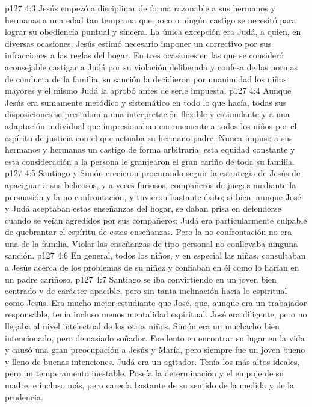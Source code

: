 \vs p127 4:3 Jesús empezó a disciplinar de forma razonable a sus hermanos y hermanas a una edad tan temprana que poco o ningún castigo se necesitó para lograr su obediencia puntual y sincera. La única excepción era Judá, a quien, en diversas ocasiones, Jesús estimó necesario imponer un correctivo por sus infracciones a las reglas del hogar. En tres ocasiones en las que se consideró aconsejable castigar a Judá por su violación deliberada y confesa de las normas de conducta de la familia, su sanción la decidieron por unanimidad los niños mayores y el mismo Judá la aprobó antes de serle impuesta.
\vs p127 4:4 Aunque Jesús era sumamente metódico y sistemático en todo lo que hacía, todas sus disposiciones se prestaban a una interpretación flexible y estimulante y a una adaptación individual que impresionaban enormemente a todos los niños por el espíritu de justicia con el que actuaba su hermano\hyp{}padre. Nunca impuso a sus hermanos y hermanas un castigo de forma arbitraria; esta equidad constante y esta consideración a la persona le granjearon el gran cariño de toda su familia.
\vs p127 4:5 Santiago y Simón crecieron procurando seguir la estrategia de Jesús de apaciguar a sus belicosos, y a veces furiosos, compañeros de juegos mediante la persuasión y la no confrontación, y tuvieron bastante éxito; si bien, aunque José y Judá aceptaban estas enseñanzas del hogar, se daban prisa en defenderse cuando se veían agredidos por sus compañeros; Judá era particularmente culpable de quebrantar el espíritu de estas enseñanzas. Pero la no confrontación no era una  de la familia. Violar las enseñanzas de tipo personal no conllevaba ninguna sanción.
\vs p127 4:6 En general, todos los niños, y en especial las niñas, consultaban a Jesús acerca de los problemas de su niñez y confiaban en él como lo harían en un padre cariñoso.
\vs p127 4:7 Santiago se iba convirtiendo en un joven bien centrado y de carácter apacible, pero sin tanta inclinación hacia lo espiritual como Jesús. Era mucho mejor estudiante que José, que, aunque era un trabajador responsable, tenía incluso menos mentalidad espiritual. José era diligente, pero no llegaba al nivel intelectual de los otros niños. Simón era un muchacho bien intencionado, pero demasiado soñador. Fue lento en encontrar su lugar en la vida y causó una gran preocupación a Jesús y María, pero siempre fue un joven bueno y lleno de buenas intenciones. Judá era un agitador. Tenía los más altos ideales, pero un temperamento inestable. Poseía la determinación y el empuje de su madre, e incluso más, pero carecía bastante de su sentido de la medida y de la prudencia.
